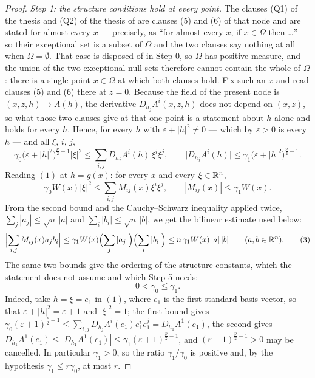 \begin{proof}
\emph{Step 1: the structure conditions hold at every point.}  The clauses
(Q1) of the thesis and (Q2) of the thesis of  are clauses
(5) and (6) of that node and are stated for almost every $x$ --- precisely, as
``for almost every $x$, if $x\in\Omega$ then \dots'' --- so their exceptional set
is a subset of $\Omega$ and the two clauses say nothing at all when
$\Omega=\emptyset$.  That case is disposed of in Step 0, so $\Omega$ has positive
measure, and the union of the two exceptional null sets therefore cannot contain
the whole of $\Omega$: there is a single point $x\in\Omega$ at which both clauses
hold.  Fix such an $x$ and read clauses (5) and (6) there at $z=0$.  Because the
field of the present node is $(x,z,h)\mapsto A(h)$, the derivative
$D_{h_j}A^i(x,z,h)$ does not depend on $(x,z)$, so what those two clauses give at
that one point is a statement about $h$ alone and holds for every $h$.  Hence,
for every $h$ with $\varepsilon+|h|^2\ne0$ --- which by $\varepsilon>0$ is every
$h$ --- and all $\xi$, $i$, $j$,
\[
\gamma_0\bigl(\varepsilon+|h|^2\bigr)^{\frac p2-1}|\xi|^2
\le\sum_{i,j}D_{h_j}A^i(h)\,\xi^i\xi^j ,
\qquad
\bigl|D_{h_j}A^i(h)\bigr|\le\gamma_1\bigl(\varepsilon+|h|^2\bigr)^{\frac p2-1} .
\tag{1}
\]
Reading $(1)$ at $h=g(x)$: for every $x$ and every $\xi\in\mathbb{R}^n$,
\[
\gamma_0W(x)|\xi|^2\le\sum_{i,j}M_{ij}(x)\xi^i\xi^j ,
\qquad
|M_{ij}(x)|\le\gamma_1W(x) .
\tag{2}
\]
From the second bound and the Cauchy--Schwarz inequality applied twice,
$\sum_j|a_j|\le\sqrt n\,|a|$ and $\sum_i|b_i|\le\sqrt n\,|b|$, we get the
bilinear estimate used below:
\[
\Bigl|\sum_{i,j}M_{ij}(x)a_jb_i\Bigr|
\le\gamma_1W(x)\Bigl(\sum_j|a_j|\Bigr)\Bigl(\sum_i|b_i|\Bigr)
\le n\,\gamma_1W(x)\,|a|\,|b|
\qquad(a,b\in\mathbb{R}^n).
\tag{3}
\]
The same two bounds give the ordering of the structure constants, which the
statement does not assume and which Step 5 needs:
\[
0<\gamma_0\le\gamma_1 .
\tag{4}
\]
Indeed, take $h=\xi=e_1$ in $(1)$, where $e_1$ is the first standard basis
vector, so that $\varepsilon+|h|^2=\varepsilon+1$ and $|\xi|^2=1$; the first
bound gives
$\gamma_0(\varepsilon+1)^{\frac p2-1}\le\sum_{i,j}D_{h_j}A^i(e_1)e_1^ie_1^j
=D_{h_1}A^1(e_1)$, the second gives
$D_{h_1}A^1(e_1)\le|D_{h_1}A^1(e_1)|\le\gamma_1(\varepsilon+1)^{\frac p2-1}$,
and $(\varepsilon+1)^{\frac p2-1}>0$ may be cancelled.  In particular
$\gamma_1>0$, so the ratio $\gamma_1/\gamma_0$ is positive and, by the
hypothesis $\gamma_1\le r\gamma_0$, at most $r$.


\end{proof}
